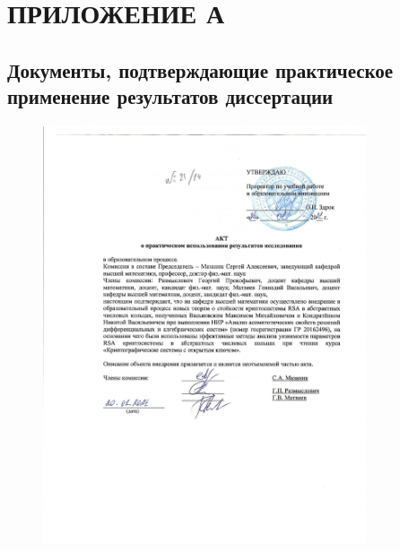 \documentclass[_00_dissertation.tex]{subfiles}
\begin{document}
\onlyinsubfile{
    \renewcommand{\contentsname}{ОГЛАВЛЕНИЕ}
    \setcounter{tocdepth}{3}
    \tableofcontents
}

\chapter*{\hfill \MakeUppercase{Приложение А}}
\section*{Документы, подтверждающие практическое применение результатов диссертации}\label{section:Appendix_counterexample}

\begin{figure}[ht!]
    \centering
    \includegraphics[width=0.85\textwidth]{../additional/Act_KondratyonokNV_page-0001.jpg}
\end{figure}
\end{document}
